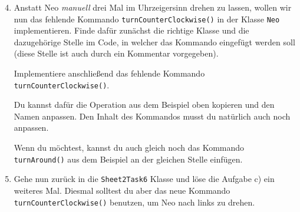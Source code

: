 \begin{enumerate} \setcounter{enumi}{3}
    \item Anstatt Neo \textit{manuell} drei Mal im Uhrzeigersinn drehen zu lassen, wollen wir nun das fehlende Kommando \lstinline{turnCounterClockwise()} in der Klasse \lstinline{Neo} implementieren. 
        Finde dafür zunächst die richtige Klasse und die dazugehörige Stelle im Code, in welcher das Kommando eingefügt werden soll (diese Stelle ist auch durch ein Kommentar vorgegeben).

        Implementiere anschließend das fehlende Kommando \lstinline{turnCounterClockwise()}.
        
        Du kannst dafür die Operation aus dem Beispiel oben kopieren und den Namen anpassen.
        Den Inhalt des Kommandos musst du natürlich auch noch anpassen.

        Wenn du möchtest, kannst du auch gleich noch das Kommando \lstinline{turnAround()} aus dem Beispiel an der gleichen Stelle einfügen.

    \item Gehe nun zurück in die \lstinline{Sheet2Task6} Klasse und löse die Aufgabe c) ein weiteres Mal.
        Diesmal solltest du aber das neue Kommando \lstinline{turnCounterClockwise()} benutzen, um Neo nach links zu drehen.
\end{enumerate}



